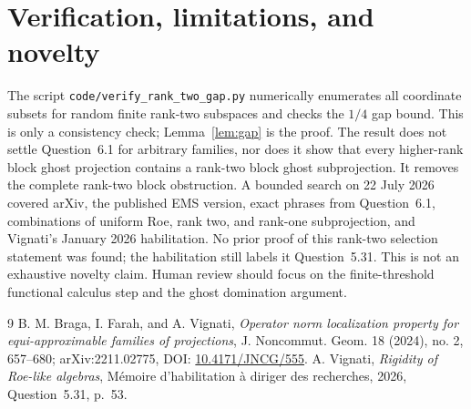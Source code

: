 \documentclass[11pt]{article}
\begin{document}
\section{Verification, limitations, and novelty}
The script \texttt{code/verify\_rank\_two\_gap.py} numerically enumerates
all coordinate subsets for random finite rank-two subspaces and checks the
$1/4$ gap bound. This is only a consistency check; Lemma~\ref{lem:gap} is
the proof.
The result does not settle Question~6.1 for arbitrary families, nor does it
show that every higher-rank block ghost projection contains a rank-two block
ghost subprojection. It removes the complete rank-two block obstruction.
A bounded search on 22 July 2026 covered arXiv, the published EMS version,
exact phrases from Question~6.1, combinations of uniform Roe, rank two, and
rank-one subprojection, and Vignati's January 2026 habilitation. No prior proof
of this rank-two selection statement was found; the habilitation still labels
it Question~5.31. This is not an exhaustive novelty claim. Human review should
focus on the finite-threshold functional calculus step and the ghost
domination argument.
\begin{thebibliography}{9}
B. M. Braga, I. Farah, and A. Vignati,
\emph{Operator norm localization property for equi-approximable families
of projections}, J. Noncommut. Geom. 18 (2024), no. 2, 657--680;
arXiv:2211.02775, DOI:
\href{https://doi.org/10.4171/JNCG/555}{10.4171/JNCG/555}.
A. Vignati, \emph{Rigidity of Roe-like algebras},
M\'emoire d'habilitation \`a diriger des recherches, 2026,
Question~5.31, p.~53.
\end{thebibliography}
\end{document}
